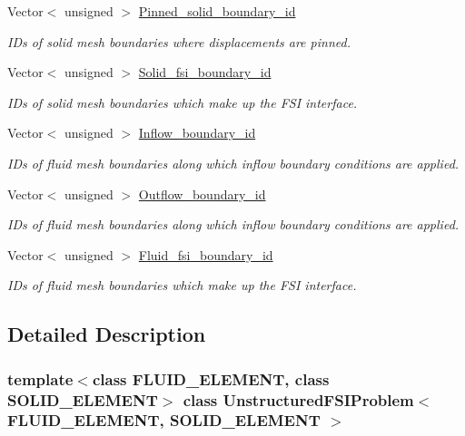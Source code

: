\begin{DoxyCompactItemize}
Vector$<$ unsigned $>$ \hyperlink{classUnstructuredFSIProblem_a788dde635a29da6a40b21629780eb9b8}{Pinned\+\_\+solid\+\_\+boundary\+\_\+id}
\begin{DoxyCompactList}\small\item\em I\+Ds of solid mesh boundaries where displacements are pinned. \end{DoxyCompactList}\item 
Vector$<$ unsigned $>$ \hyperlink{classUnstructuredFSIProblem_a286830595411866cbbb3a43313d76285}{Solid\+\_\+fsi\+\_\+boundary\+\_\+id}
\begin{DoxyCompactList}\small\item\em I\+Ds of solid mesh boundaries which make up the F\+SI interface. \end{DoxyCompactList}\item 
Vector$<$ unsigned $>$ \hyperlink{classUnstructuredFSIProblem_a75cb40c497f6b54e05741df6e9c430ba}{Inflow\+\_\+boundary\+\_\+id}
\begin{DoxyCompactList}\small\item\em I\+Ds of fluid mesh boundaries along which inflow boundary conditions are applied. \end{DoxyCompactList}\item 
Vector$<$ unsigned $>$ \hyperlink{classUnstructuredFSIProblem_ab3ca6da48fb75f5b56cd2f0b581a2da0}{Outflow\+\_\+boundary\+\_\+id}
\begin{DoxyCompactList}\small\item\em I\+Ds of fluid mesh boundaries along which inflow boundary conditions are applied. \end{DoxyCompactList}\item 
Vector$<$ unsigned $>$ \hyperlink{classUnstructuredFSIProblem_a79fee04b489d1ce1f822eec9d34251e5}{Fluid\+\_\+fsi\+\_\+boundary\+\_\+id}
\begin{DoxyCompactList}\small\item\em I\+Ds of fluid mesh boundaries which make up the F\+SI interface. \end{DoxyCompactList}\end{DoxyCompactItemize}


\subsection{Detailed Description}
\subsubsection*{template$<$class F\+L\+U\+I\+D\+\_\+\+E\+L\+E\+M\+E\+NT, class S\+O\+L\+I\+D\+\_\+\+E\+L\+E\+M\+E\+NT$>$\newline
class Unstructured\+F\+S\+I\+Problem$<$ F\+L\+U\+I\+D\+\_\+\+E\+L\+E\+M\+E\+N\+T, S\+O\+L\+I\+D\+\_\+\+E\+L\+E\+M\+E\+N\+T $>$}

